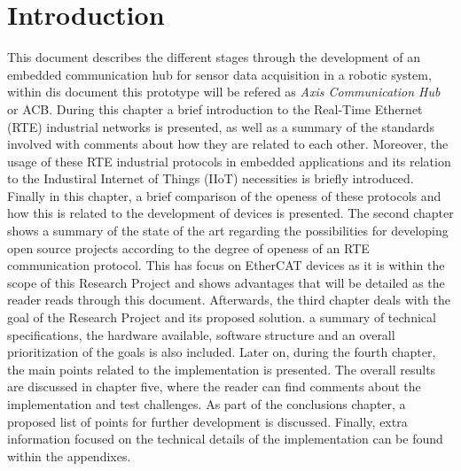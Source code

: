 \chapter{Introduction}

%
%  
%
%


This document describes the different stages through the development of an embedded communication hub for sensor
data acquisition in a robotic system, within dis document this prototype will be refered as \emph{Axis Communication Hub} or ACB. 
During this chapter a brief introduction to the Real-Time Ethernet (RTE) industrial networks is presented, as well as 
a summary of the standards involved with comments about how they are related to each other. Moreover, the usage of these RTE 
industrial protocols in embedded applications and its relation to the Industiral Internet of Things (IIoT) necessities is 
briefly introduced. Finally in this chapter, a brief comparison of the openess of these protocols and how this is related 
to the development of devices is presented. 
The second chapter shows a summary of the state of the art regarding the possibilities for developing open source projects 
according to the degree of openess of an RTE communication protocol. This has focus on EtherCAT devices as it is within the 
scope of this Research Project and shows advantages that will be detailed as the reader reads through this document. 
Afterwards, the third chapter deals with the goal of the Research Project and its proposed solution. 
a summary of technical specifications, the hardware available, software structure and an overall prioritization of the goals
is also included. 
Later on, during the fourth chapter, the main points related to the implementation is presented. 
The overall results are discussed in chapter five, where the reader can find comments about the implementation and test 
challenges. As part of the conclusions chapter, a proposed list of points for further development is discussed. 
Finally, extra information focused on the technical details of the implementation can be found within the appendixes.

